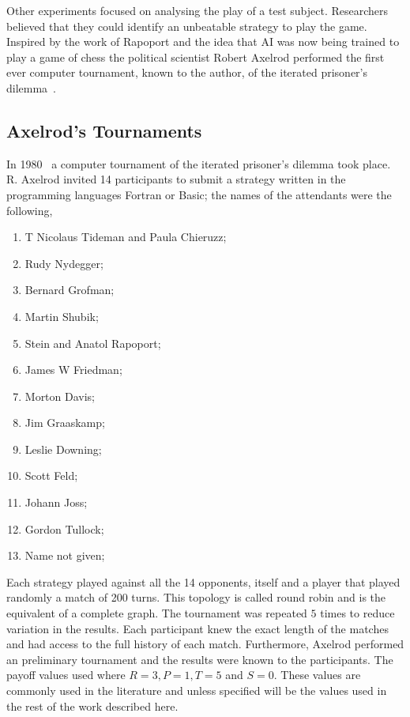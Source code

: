 \documentclass{article}
\begin{document}
Other experiments focused on analysing the play of a test subject. Researchers believed
that they could identify an unbeatable strategy to play the game. Inspired by 
the work of Rapoport and the idea that AI was now being trained to play a 
game of chess the political scientist Robert Axelrod performed
the first ever computer tournament, known to the author, of the iterated 
prisoner's dilemma~\cite{axelrod2012, Axelrod1981}.

\subsection{Axelrod's Tournaments}\label{subsection:axelrods_tournament}

In 1980~\cite{axelrod1980a} a computer tournament of the iterated prisoner's
dilemma took place. R. Axelrod invited 14 participants to submit a strategy written
in the programming languages Fortran or Basic; the names of the attendants were
the following,

\begin{multicols}{2}
    \begin{enumerate}
        \item T Nicolaus Tideman and Paula Chieruzz;
        \item Rudy Nydegger;
        \item Bernard Grofman;
        \item Martin Shubik;
        \item Stein and Anatol Rapoport;
        \item James W Friedman;
        \item Morton Davis;
        \item Jim Graaskamp;
        \item Leslie Downing;
        \item Scott Feld;
        \item Johann Joss;
        \item Gordon Tullock;
        \item Name not given;
    \end{enumerate}
\end{multicols}

Each strategy played against all the 14 opponents, itself and a player that played
randomly a match of 200 turns. This topology is called round robin and is the 
equivalent of a complete graph. The tournament was repeated \(5\) times to
reduce variation in the results. Each participant knew the exact length of the
matches and had access to the full history of each match. Furthermore, Axelrod
performed an preliminary tournament and the results were known to the participants.
The payoff values used where \(R=3, P=1, T=5\) and \(S=0\). These values are
commonly used in the literature and unless specified will be the values used in
the rest of the work described here. 
\end{document}
